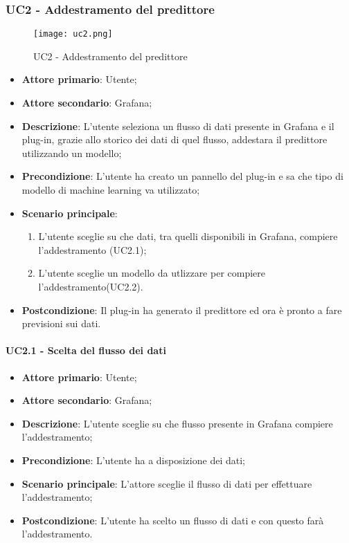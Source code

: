 \newpage
\subsubsection{UC2 - Addestramento del predittore}
\label{sssec:uc2}

\begin{figure}[h!]
  \begin{center}
    \texttt{[image: uc2.png]}\\
    \caption{UC2 - Addestramento del predittore}%
    \label{fig:uc2}
  \end{center}
\end{figure}

\begin{itemize}
  \item \textbf{Attore primario}:  Utente;
  \item \textbf{Attore secondario}: Grafana;
  \item \textbf{Descrizione}: L'utente seleziona un flusso di dati presente in Grafana e il plug-in, grazie allo storico dei dati di quel flusso, addestara il predittore utilizzando un modello;
  \item \textbf{Precondizione}: L'utente ha creato un pannello del plug-in e sa che tipo di modello di machine learning va utilizzato;
  \item \textbf{Scenario principale}:
  \begin{enumerate}
    \item L'utente sceglie su che dati, tra quelli disponibili in Grafana, compiere l'addestramento (UC2.1);
    \item L'utente sceglie un modello da utlizzare per compiere l'addestramento(UC2.2).
  \end{enumerate}
  \item \textbf{Postcondizione}: Il plug-in ha generato il predittore ed ora è pronto a fare previsioni sui dati.
\end{itemize}

\paragraph{UC2.1 - Scelta del flusso dei dati}
\label{para:uc2.1}
\begin{itemize}
  \item \textbf{Attore primario}: Utente;
  \item \textbf{Attore secondario}: Grafana;
  \item \textbf{Descrizione}: L'utente sceglie su che flusso presente in Grafana compiere l'addestramento;
  \item \textbf{Precondizione}: L'utente ha a disposizione dei dati;
  \item \textbf{Scenario principale}: L'attore sceglie il flusso di dati per effettuare l'addestramento;
  \item \textbf{Postcondizione}: L'utente ha scelto un flusso di dati e con questo farà l'addestramento.
\end{itemize}


